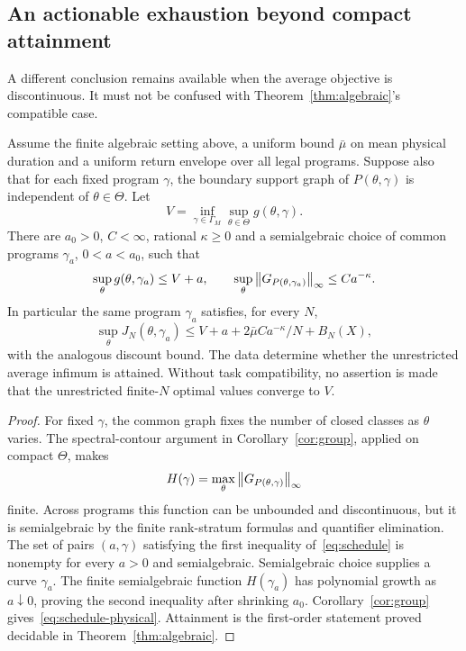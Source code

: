 \subsection{An actionable exhaustion beyond compact attainment}
A different conclusion remains available when the average objective is discontinuous. It must not be confused with Theorem~\ref{thm:algebraic}'s compatible case.

\begin{theorem}\label{thm:schedule}
Assume the finite algebraic setting above, a uniform bound $\bar\mu$ on mean physical duration and a uniform return envelope over all legal programs. Suppose also that for each fixed program $\gamma$, the boundary support graph of $P(\theta,\gamma)$ is independent of $\theta\in\Theta$. Let
\[
 V=\inf_{\gamma\in\Gamma_M}\sup_{\theta\in\Theta}g(\theta,\gamma).
\]
There are $a_0>0$, $C<\infty$, rational $\kappa\ge0$ and a semialgebraic choice of common programs $\gamma_a$, $0<a<a_0$, such that
\begin{equation}\label{eq:schedule}
 \sup_\theta g(\theta,\gamma_a)\le V+a,
 \qquad
 \sup_\theta\left\lVert G_{P(\theta,\gamma_a)}\right\rVert_\infty\le Ca^{-\kappa}.
\end{equation}
In particular the same program $\gamma_a$ satisfies, for every $N$,
\begin{equation}\label{eq:schedule-physical}
 \sup_\theta J_N(\theta,\gamma_a)
 \le V+a+2\bar\mu Ca^{-\kappa}/N+B_N(X),
\end{equation}
with the analogous discount bound. The data determine whether the unrestricted average infimum is attained. Without task compatibility, no assertion is made that the unrestricted finite-$N$ optimal values converge to $V$.
\end{theorem}
\begin{proof}
For fixed $\gamma$, the common graph fixes the number of closed classes as $\theta$ varies. The spectral-contour argument in Corollary~\ref{cor:group}, applied on compact $\Theta$, makes
\[
 H(\gamma)=\max_\theta\left\lVert G_{P(\theta,\gamma)}\right\rVert_\infty
\]
finite. Across programs this function can be unbounded and discontinuous, but it is semialgebraic by the finite rank-stratum formulas and quantifier elimination. The set of pairs $(a,\gamma)$ satisfying the first inequality of~\eqref{eq:schedule} is nonempty for every $a>0$ and semialgebraic. Semialgebraic choice supplies a curve $\gamma_a$. The finite semialgebraic function $H(\gamma_a)$ has polynomial growth as $a\downarrow0$, proving the second inequality after shrinking $a_0$. Corollary~\ref{cor:group} gives~\eqref{eq:schedule-physical}. Attainment is the first-order statement proved decidable in Theorem~\ref{thm:algebraic}.
\end{proof}
